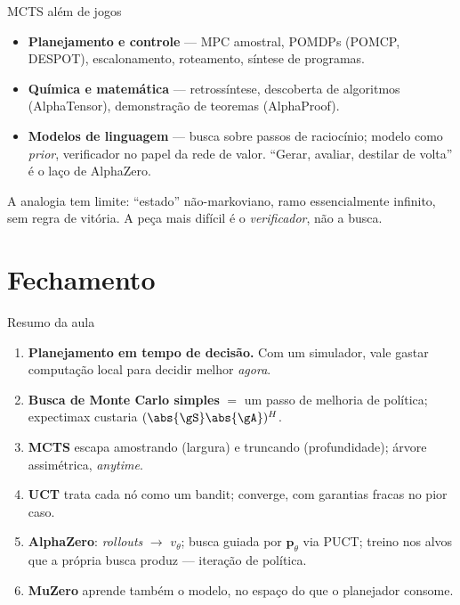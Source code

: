 \documentclass[aspectratio=169, 11pt]{beamer}
\begin{document}
\begin{frame}{MCTS além de jogos}
  \begin{itemize}
    \item \textbf{Planejamento e controle} --- MPC amostral, POMDPs (POMCP, DESPOT), escalonamento, roteamento, síntese de programas.
    \item \textbf{Química e matemática} --- retrossíntese, descoberta de algoritmos (AlphaTensor), demonstração de teoremas (AlphaProof).
    \item \textbf{Modelos de linguagem} --- busca sobre passos de raciocínio; modelo como \emph{prior}, verificador no papel da rede de valor. ``Gerar, avaliar, destilar de volta'' é o laço de AlphaZero.
  \end{itemize}

  \pause
  \begin{alertabox}
    A analogia tem limite: ``estado'' não-markoviano, ramo essencialmente infinito, sem regra de vitória. A peça mais difícil é o \emph{verificador}, não a busca.
  \end{alertabox}
\end{frame}

\section{Fechamento}

\begin{frame}{Resumo da aula}
  \begin{enumerate}
    \item \textbf{Planejamento em tempo de decisão.} Com um simulador, vale gastar computação local para decidir melhor \emph{agora}.
    \item \textbf{Busca de Monte Carlo simples} $=$ um passo de melhoria de política; expectimax custaria $(\abs{\gS}\abs{\gA})^H$.
    \item \textbf{MCTS} escapa amostrando (largura) e truncando (profundidade); árvore assimétrica, \emph{anytime}.
    \item \textbf{UCT} trata cada nó como um bandit; converge, com garantias fracas no pior caso.
    \item \textbf{AlphaZero}: \emph{rollouts} $\to$ $v_\theta$; busca guiada por $\bm{p}_\theta$ via PUCT; treino nos alvos que a própria busca produz — iteração de política.
    \item \textbf{MuZero} aprende também o modelo, no espaço do que o planejador consome.
  \end{enumerate}
\end{frame}
\end{document}
